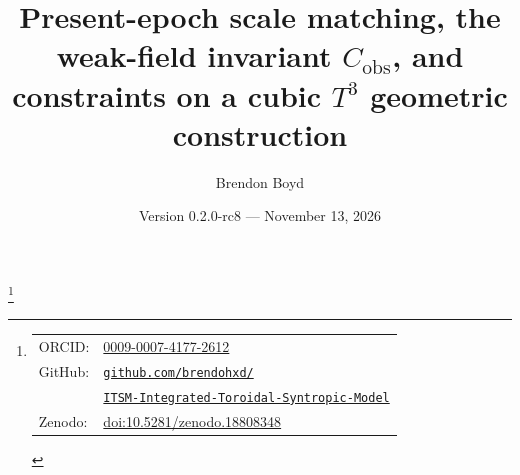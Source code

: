 \documentclass[aps,prd,reprint,superscriptaddress,nofootinbib,floatfix,showkeys]{revtex4-2}
\newcommand{\Tthree}{T^{3}}
\newcommand{\Cobs}{C_{\mathrm{obs}}}
\begin{document}
\title{Present-epoch scale matching, the weak-field invariant
\texorpdfstring{\(\Cobs\)}{C\_obs}, and constraints on a cubic
\texorpdfstring{\(\Tthree\)}{T3} geometric construction}

\author{Brendon Boyd}
\thanks{%
\begin{tabular}{@{}l@{\ }l@{}}
ORCID: & \href{https://orcid.org/0009-0007-4177-2612}{0009-0007-4177-2612} \\
GitHub: & \href{https://github.com/brendohxd/ITSM-Integrated-Toroidal-Syntropic-Model}{\nolinkurl{github.com/brendohxd/}} \\
        & \href{https://github.com/brendohxd/ITSM-Integrated-Toroidal-Syntropic-Model}{\nolinkurl{ITSM-Integrated-Toroidal-Syntropic-Model}} \\
Zenodo: & \href{https://doi.org/10.5281/zenodo.18808348}{doi:10.5281/zenodo.18808348} \\
\end{tabular}%
}

\date{Version 0.2.0-rc8 --- November 13, 2026}
\end{document}
